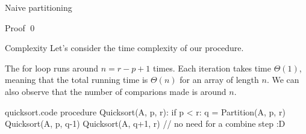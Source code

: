 \documentclass[a4paper]{article}
\begin{document}
\begin{parag}{Naive partitioning}
\begin{subparag}{Proof}
        \qed
    \end{subparag}

    \begin{subparag}{Complexity}
        Let's consider the time complexity of our procedure. 

        The for loop runs around $n = r - p + 1$ times. Each iteration takes time $\Theta\left(1\right)$, meaning that the total running time is $\Theta\left(n\right)$ for an array of length $n$. We can also observe that the number of comparions made is around $n$.
    \end{subparag}
\end{parag}

\begin{filecontents*}[overwrite]{quicksort.code}
procedure Quicksort(A, p, r):
    if p < r:
        q = Partition(A, p, r)
        Quicksort(A, p, q-1)
        Quicksort(A, q+1, r)
        // no need for a combine step :D
\end{filecontents*}
\end{document}
